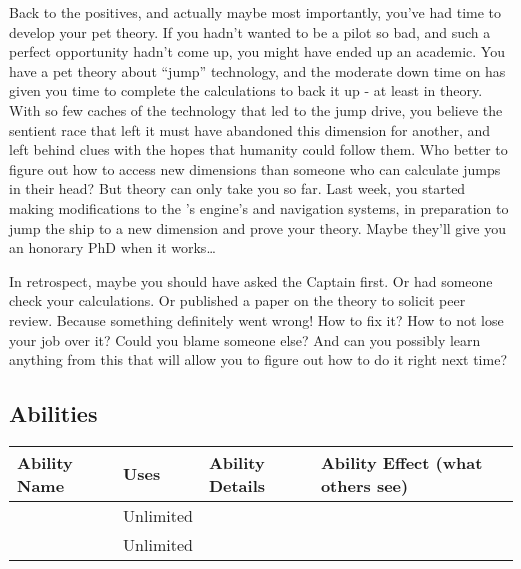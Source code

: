 \documentclass[char]{TMFHope}
\begin{document}
Back to the positives, and actually maybe most importantly, you've had time to develop your pet theory. If you hadn't wanted to be a pilot so bad, and such a perfect opportunity hadn't come up, you might have ended up an academic. You have a pet theory about ``jump'' technology, and the moderate down time on \pNew{} has given you time to complete the calculations to back it up - at least in theory. With so few caches of the technology that led to the jump drive, you believe the sentient race that left it must have abandoned this dimension for another, and left behind clues with the hopes that humanity could follow them. Who better to figure out how to access new dimensions than someone who can calculate jumps in their head? But theory can only take you so far. Last week, you started making modifications to the \pNew{}'s engine's and navigation systems, in preparation to jump the ship to a new dimension and prove your theory. Maybe they'll give you an honorary PhD when it works\ldots

In retrospect, maybe you should have asked the Captain first. Or had someone check your calculations. Or published a paper on the theory to solicit peer review. Because something definitely went wrong! How to fix it? How to not lose your job over it? Could you blame someone else? And can you possibly learn anything from this that will allow you to figure out how to do it right next time?

\subsection*{Abilities}
\begin{tabular}{|p{3cm}|p{1.5cm}|p{8.5cm}|p{3cm}|} 
 \hline
 \textbf{Ability Name} & \textbf{Uses} & \textbf{Ability Details} & \textbf{Ability Effect (what others see)} \\ 
\hline 
 \aInvestigate{\MYname} & Unlimited & \aInvestigate{\MYtext} & \aInvestigate{\MYeffect} \\
 \hline
	\aPractice{\MYname} & Unlimited & \aPractice{\MYtext} & \aPractice{\MYeffect} \\ 
\hline
\end{tabular}
\end{document}
